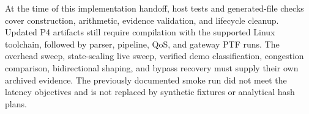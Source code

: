At the time of this implementation handoff, host tests and generated-file checks cover
construction, arithmetic, evidence validation, and lifecycle cleanup. Updated P4 artifacts
still require compilation with the supported Linux toolchain, followed by parser, pipeline,
QoS, and gateway PTF runs. The overhead sweep, state-scaling live sweep, verified demo
classification, congestion comparison, bidirectional shaping, and bypass recovery must
supply their own archived evidence. The previously documented smoke run did not meet the
latency objectives and is not replaced by synthetic fixtures or analytical hash plans.
